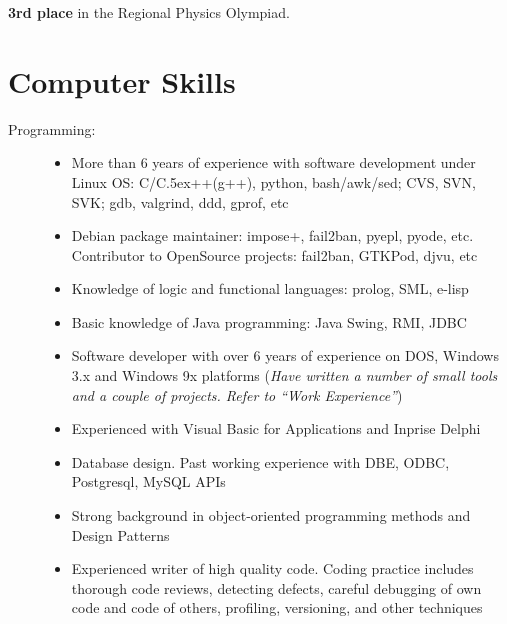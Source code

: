 \documentclass[10pt,overlapped,line]{res}
\def\Cplusplus{{\rm C\raise.5ex\hbox{\small ++}}}
\newcommand{\mplace}[1]{\textbf{#1}}
\newcommand{\wdescription}[1]{({\small \textit{#1}})}
\begin{document}
\begin{resume}
 \begin{position}
   \mplace{3rd place} in the Regional Physics Olympiad.

 \end{position}

 \section{Computer Skills}
  \begin{description}
    \item[Programming:]\hspace*{\fill}
      \begin{itemize}
      \item More than 6 years of experience with software development
        under Linux OS: C/\Cplusplus(g++), python, bash/awk/sed;
        CVS, SVN, SVK; gdb, valgrind, ddd, gprof, etc

      \item Debian package maintainer: impose+, fail2ban, pyepl,
        pyode, etc. Contributor to {O}pen{S}ource projects:
        fail2ban, GTKPod, djvu, etc

      \item Knowledge of logic and functional languages: prolog, SML, e-lisp

      \item Basic knowledge of Java programming: Java Swing, RMI,
        JDBC

      \item Software developer with over 6 years of experience on DOS,
        Windows 3.x and Windows 9x platforms
        \wdescription{Have written a number of small tools and a couple of
          projects. Refer to ``Work Experience''}

      \item Experienced with Visual Basic for Applications and Inprise
        Delphi

      \item Database design. Past working experience with DBE, ODBC,
        Postgresql, MySQL APIs

      \item Strong background in object-oriented programming methods
        and Design Patterns

      \item Experienced writer of high quality code. Coding practice
        includes thorough code reviews, detecting defects, careful
        debugging of own code and code of others, profiling,
        versioning, and other techniques
      \end{itemize}


\end{description}
\end{resume}
\end{document}
